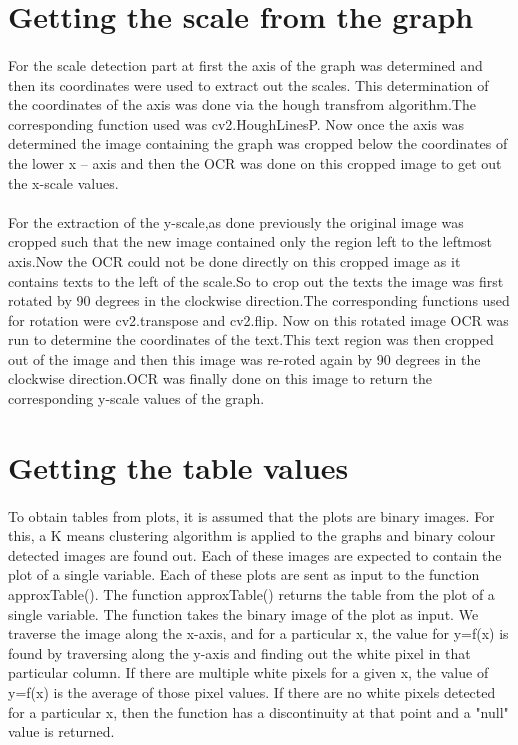 \documentclass[12pts]{scrreprt}
\begin{document}
\section{Getting the scale from the graph}
\paragraph{}
For the scale detection part at first the axis of the graph was determined and then its coordinates were used to extract out the scales. This determination of the coordinates of the axis was done via the hough transfrom algorithm.The corresponding function used was cv2.HoughLinesP.
Now once the axis was determined the image containing the graph was cropped below the coordinates of the lower x – axis and then the OCR was done on this cropped image to get out the x-scale values.
\paragraph{}
For the extraction of the y-scale,as done previously the original image was cropped such that the new image contained only the region left to the leftmost axis.Now the OCR could not be done directly on this cropped image as it contains texts to the left of the scale.So to crop out the texts the image was first rotated by 90 degrees in the clockwise direction.The corresponding functions used for rotation were cv2.transpose
 and cv2.flip. Now on this rotated image OCR was run to determine the coordinates of the text.This text region was then cropped out of the image and then this image was re-roted again by 90 degrees in the clockwise direction.OCR was finally done on this image to return the corresponding y-scale values of the graph.
\section{Getting the table values}
\paragraph{}
To obtain tables from plots, it is assumed that the plots are binary images. For this, a K means clustering algorithm is applied to the graphs and binary colour detected images are found out. Each of these images are expected to contain the plot of a single variable. Each of these plots are sent as input to the function approxTable(). The function approxTable() returns the table from the plot of a single variable. The function takes the binary image of the plot as input. We traverse the image along the x-axis, and for a particular x, the value for y=f(x) is found by traversing along the y-axis and finding out the white pixel in that particular column. If there are multiple white pixels for a given x, the value of y=f(x) is the average of those pixel values. If there are no white pixels detected for a particular x, then the function has a discontinuity at that point and a "null" value is returned.
\end{document}
